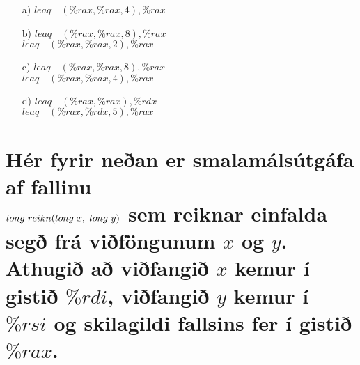 \documentclass{article}
\begin{document}
	\begin{itemize}
		\item[a)] $leaq \hspace{1em} (\%rax, \%rax, 4), \%rax$
		\item[b)] $leaq \hspace{1em} (\%rax, \%rax, 8), \%rax$ \\
				  $leaq \hspace{1em} (\%rax, \%rax, 2), \%rax$
		\item[c)] $leaq \hspace{1em} (\%rax, \%rax, 8), \%rax$ \\
				  $leaq \hspace{1em} (\%rax, \%rax, 4), \%rax$
		\item[d)] $leaq \hspace{1em} (\%rax, \%rax), \%rdx$ \\
				  $leaq \hspace{1em} (\%rax, \%rdx, 5), \%rax$
	\end{itemize}

	\section{Hér fyrir neðan er smalamálsútgáfa af fallinu \\ $long 
		\hspace{0.3em} reikn(long \hspace{0.3em}x, \hspace{0.3em}long 
	 \hspace{0.3em}y)$ sem reiknar einfalda segð frá viðföngunum $x$ og $y$. 
 Athugið að viðfangið $x$ kemur í gistið $\%rdi$, viðfangið $y$ kemur í 
$\%rsi$ og skilagildi fallsins fer í gistið $\%rax$.}
\end{document}
